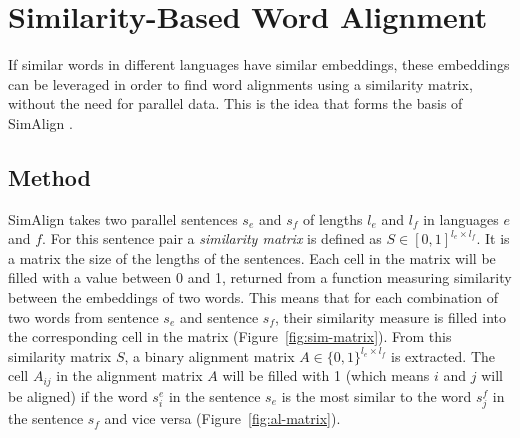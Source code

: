 \section{Similarity-Based Word Alignment}



If similar words in different languages have similar embeddings, these embeddings can be  leveraged in order to find word alignments using a similarity matrix, without the need for parallel data. This is the idea that forms the basis of SimAlign \autocite{jalili-sabet-etal-2020-simalign}.

\subsection{Method}
\label{subsec:simalign-method}
SimAlign takes two parallel sentences $s_e$ and $s_f$ of lengths $l_e$ and $l_f$ in languages $e$ and $f$. 
For this sentence pair a \emph{similarity matrix} is defined as $S \in [0,1]^{l_e\times l_f}$. 
It is a matrix the size of the lengths of the sentences. Each cell in the matrix will be filled with a value between 0 and 1, returned from a function measuring similarity between the embeddings of two words. 
This means that for each combination of two words from sentence $s_e$ and sentence $s_f$, their similarity measure is filled into the corresponding cell in the matrix (Figure~\ref{fig:sim-matrix}).
From this similarity matrix $S$, a binary alignment matrix $A \in \{0,1\}^{l_e \times l_f}$ is extracted. 
The cell $A_{ij}$ in the alignment matrix $A$ will be filled with 1 (which means $i$ and $j$ will be aligned) if the word $s_i^e$ in the sentence $s_e$ is the most similar to the word $s_j^f$ in the sentence $s_f$ and vice versa (Figure~\ref{fig:al-matrix}).



